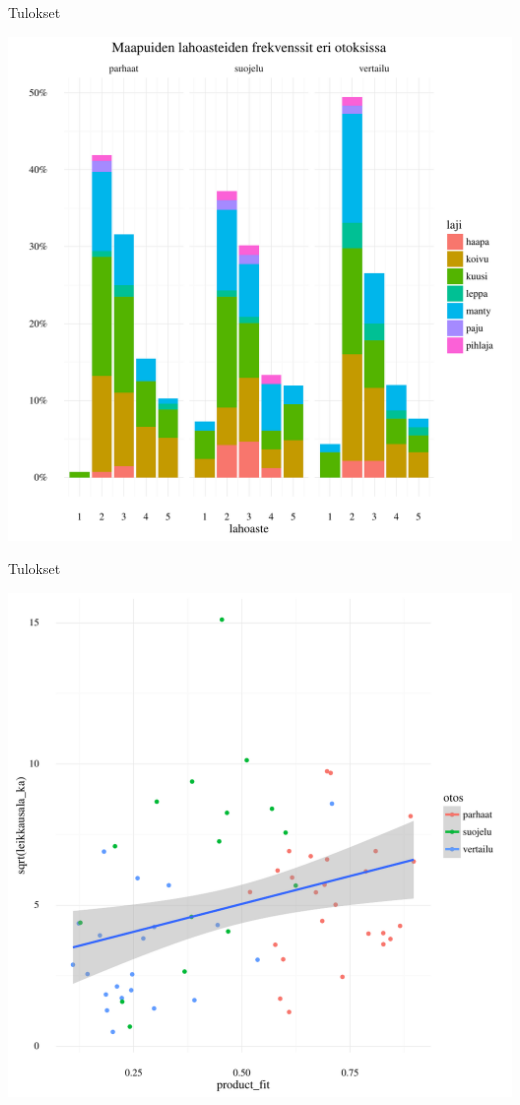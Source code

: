 \documentclass{beamer}
\begin{document}
\begin{frame}{Tulokset}
  \begin{center}
    \includegraphics[height = 0.9\textheight]{lahoastefrekvenssit.pdf}
  \end{center}
\end{frame}

\begin{frame}{Tulokset}
  \begin{center}
    \includegraphics[height = 0.9\textheight]{vastaavus.pdf}
  \end{center}
\end{frame}
\end{document}
